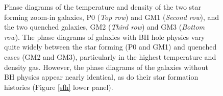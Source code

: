 \documentclass[]{emulateapj}
\begin{document}
\begin{figure}[h!]
\centerline{
}
\caption[]{Phase diagrams of the temperature and density of the two star forming zoom-in galaxies, P0 (\textit{Top row}) and GM1 (\textit{Second row}), and the two quenched galaxies, GM2 (\textit{Third row}) and GM3 (\textit{Bottom row}). The phase diagrams of galaxies with BH hole physics vary quite widely between the star forming (P0 and GM1) and quenched cases (GM2 and GM3), particularly in the highest temperature and density gas. However, the phase diagrams of the galaxies without BH physics appear nearly identical, as do their star formation histories (Figure \ref{sfh} lower panel).}
\label{phasediagrams}
\end{figure}
\end{document}
